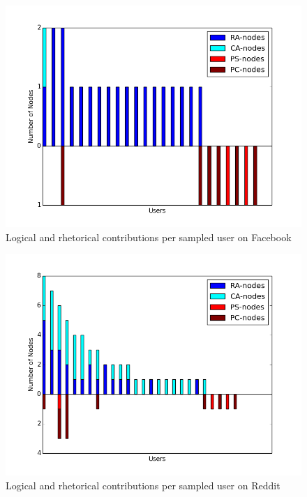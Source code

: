 \begin{figure}
\centering
\includegraphics[scale=\scaleResults]{./figures/rhetoric_per_user/facebook.png}
\caption{Logical and rhetorical contributions per sampled user on Facebook}
\label{figure:rhetoricuser:Facebook}
\end{figure}

\begin{figure}
\centering
\includegraphics[scale=\scaleResults]{./figures/rhetoric_per_user/reddit.png}
\caption{Logical and rhetorical contributions per sampled user on Reddit}
\label{figure:rhetoricuser:reddit}
\end{figure}

